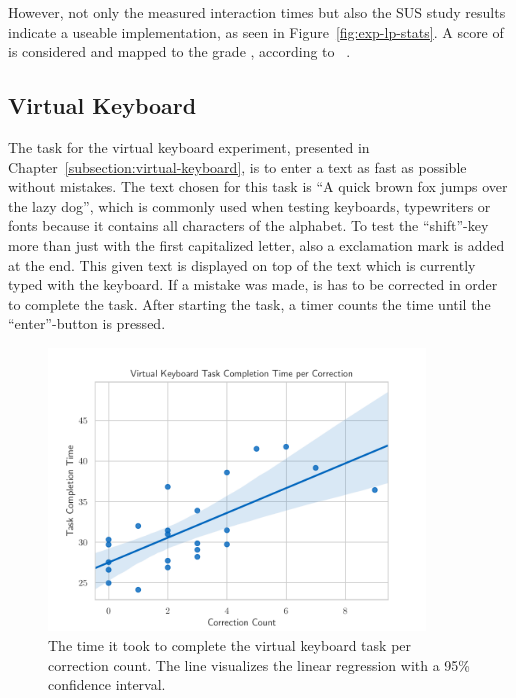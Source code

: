 However, not only the measured interaction times but also the \ac{SUS} study results indicate a useable implementation, as seen in Figure~\ref{fig:exp-lp-stats}. A score of \evalExpLpSusScore{} is considered \evalExpLpSusAdj{} and mapped to the grade \evalExpLpSusGrade{}, according to \citeauthor{Bangor.2009}~\cite[120\psq]{Bangor.2009}.



\subsection{Virtual Keyboard}\label{section:eval-res-vk}

The task for the virtual keyboard experiment, presented in Chapter~\ref{subsection:virtual-keyboard}, is to enter a text as fast as possible without mistakes. The text chosen for this task is \enquote{A quick brown fox jumps over the lazy dog}, which is commonly used when testing keyboards, typewriters or fonts because it contains all characters of the alphabet. To test the \enquote{shift}-key more than just with the first capitalized letter, also a exclamation mark is added at the end. This given text is displayed on top of the text which is currently typed with the keyboard. If a mistake was made, is has to be corrected in order to complete the task. After starting the task, a timer counts the time until the \enquote{enter}-button is pressed.

\begin{figure}[H]
  \centering
  \includegraphics[width=10cm]{figures/evaluation/eval_exp_vk_ratio_scatter.pdf}
  \caption[Virtual keyboard experiment results]{The time it took to complete the virtual keyboard task per correction count. The line visualizes the linear regression with a 95\% confidence interval.}\label{fig:eval-exp-vk-ratio-scatter}
\end{figure}

